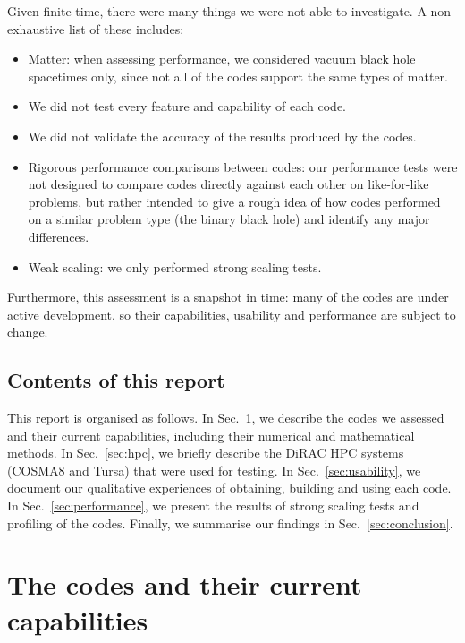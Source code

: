 \documentclass[12pt,a4paper]{article}
\numberwithin{figure}{subsection}
\begin{document}
Given finite time, there were many things we were not able to investigate. A
non-exhaustive list of these includes:
\begin{itemize}
    \item Matter: when assessing performance, we considered vacuum black hole spacetimes only, since not all
    of the codes support the same types of matter.
    \item We did not test every feature and capability of each code.
    \item We did not validate the accuracy of the results produced by the codes.
    \item Rigorous performance comparisons between codes: our performance tests
    were not designed to compare codes directly against each other on
    like-for-like problems, but rather intended to give a rough idea of how codes performed on
    a similar problem type (the binary black hole) and identify any major differences.
    \item Weak scaling: we only performed strong scaling tests.
\end{itemize}
Furthermore, this assessment is a snapshot in time: many of the codes are
under active development, so their capabilities, usability and performance are
subject to change.

\subsection{Contents of this report}

This report is organised as follows. In Sec.~\ref{sec:codes}, we describe the
codes we assessed and their current capabilities, including their numerical and
mathematical methods. In Sec.~\ref{sec:hpc}, we briefly describe the DiRAC HPC
systems (COSMA8 and Tursa) that were used for testing. In
Sec.~\ref{sec:usability}, we document our qualitative experiences of obtaining,
building and using each code. In Sec.~\ref{sec:performance}, we present the
results of strong scaling tests and profiling of the codes. Finally, we
summarise our findings in Sec.~\ref{sec:conclusion}.

\section{The codes and their current capabilities}
\label{sec:codes}
\end{document}
